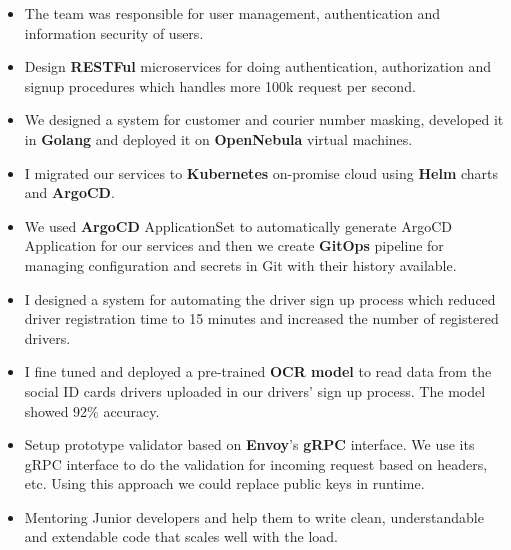 \vspace{0.5cm}

\begin{itemize}
      \item The team was responsible for user management, authentication and information security of users.
      \item Design \textbf{RESTFul} microservices for doing authentication, authorization and signup procedures which handles more 100k request per second.
      \item We designed a system for customer and courier number masking, developed it in \textbf{Golang} and deployed it on \textbf{OpenNebula} virtual machines.
      \item I migrated our services to \textbf{Kubernetes} on-promise cloud using \textbf{Helm} charts and \textbf{ArgoCD}.
      \item We used \textbf{ArgoCD} ApplicationSet to automatically generate ArgoCD Application for our services and then we create \textbf{GitOps} pipeline for managing configuration and secrets in Git with their history available.
      \item I designed a system for automating the driver sign up process which reduced driver registration time to 15 minutes and increased the number of registered drivers.
      \item I fine tuned and deployed a pre-trained \textbf{OCR model} to read data from the social ID cards drivers uploaded in our drivers' sign up process. The model showed 92\% accuracy.
      \item Setup prototype validator based on \textbf{Envoy}'s \textbf{gRPC} interface. We use its gRPC interface to do the validation for incoming request
            based on headers, etc. Using this approach we could replace public keys in runtime.
      \item Mentoring Junior developers and help them to write clean, understandable and extendable code that scales well with the load.
\end{itemize}

\vspace{0.5cm}

